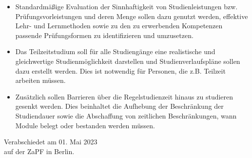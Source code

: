\documentclass[DIV=calc]{scrartcl}
\newcommand{\replace}[2]{
    \sout{\textcolor{blue}{#1}}~\textcolor{blue}{#2}}
\begin{document}
\begin{itemize}
    \item Standardmäßige Evaluation der Sinnhaftigkeit von Studienleistungen bzw. Prüfungsvorleistungen und deren Menge sollen dazu genutzt werden, effektive Lehr- und Lernmethoden sowie zu den zu erwerbenden Kompetenzen passende Prüfungsformen zu identifizieren und umzusetzen.
    \item Das Teilzeitstudium soll für alle Studiengänge eine realistische und gleichwertige Studienmöglichkeit darstellen und Studienverlaufspläne sollen dazu erstellt werden. Dies ist notwendig für Personen, die z.B. Teilzeit arbeiten müssen.
    \item Zusätzlich sollen Barrieren über die Regelstudienzeit hinaus zu studieren gesenkt werden. Dies beinhaltet die Aufhebung der Beschränkung der Studiendauer sowie die Abschaffung von zeitlichen Beschränkungen, wann Module belegt oder bestanden werden müssen.
\end{itemize}



\vspace{1cm} 

\vfill
\begin{flushright}
	Verabschiedet am 01. Mai 2023 \\
	auf der ZaPF in Berlin.
\end{flushright}
\end{document}
